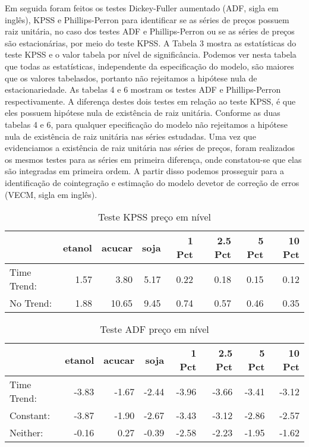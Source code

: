 Em seguida foram feitos os testes Dickey-Fuller aumentado (ADF, sigla em
inglês), KPSS e Phillips-Perron para identificar se as séries de preços
possuem raiz unitária, no caso dos testes ADF e Phillips-Perron ou se as
séries de preços são estacionárias, por meio do teste KPSS. A Tabela 3
mostra as estatísticas do teste KPSS e o valor tabela por nível de
significância. Podemos ver nesta tabela que todas as estatísticas,
independente da especificação do modelo, são maiores que os valores
tabelasdos, portanto não rejeitamos a hipótese nula de estacionariedade.
As tabelas 4 e 6 mostram os testes ADF e Phillips-Perron
respectivamente. A diferença destes dois testes em relação ao teste
KPSS, é que eles possuem hipótese nula de existência de raiz unitária.
Conforme as duas tabelas 4 e 6, para qualquer epecificação do modelo não
rejeitamos a hipótese nula de existência de raiz unitária nas séries
estudadas. Uma vez que evidenciamos a existência de raiz unitária nas
séries de preços, foram realizados os mesmos testes para as séries em
primeira diferença, onde constatou-se que elas são integradas em
primeira ordem. A partir disso podemos prosseguir para a identificação
de cointegração e estimação do modelo devetor de correção de erros
(VECM, sigla em inglês).

\begin{longtable}[t]{lrrrrrrr}
\caption{\label{tab:ADF e KPSS nivel}Teste KPSS preço em nível}\\
\toprule
  & etanol & acucar & soja & 1 Pct & 2.5 Pct & 5 Pct & 10 Pct\\
\midrule
Time Trend: & 1.57 & 3.80 & 5.17 & 0.22 & 0.18 & 0.15 & 0.12\\
No Trend: & 1.88 & 10.65 & 9.45 & 0.74 & 0.57 & 0.46 & 0.35\\
\bottomrule
\end{longtable}

\begin{longtable}[t]{lrrrrrrr}
\caption{\label{tab:ADF e KPSS nivel}Teste ADF preço em nível}\\
\toprule
  & etanol & acucar & soja & 1 Pct & 2.5 Pct & 5 Pct & 10 Pct\\
\midrule
Time Trend: & -3.83 & -1.67 & -2.44 & -3.96 & -3.66 & -3.41 & -3.12\\
Constant: & -3.87 & -1.90 & -2.67 & -3.43 & -3.12 & -2.86 & -2.57\\
Neither: & -0.16 & 0.27 & -0.39 & -2.58 & -2.23 & -1.95 & -1.62\\
\bottomrule
\end{longtable}

